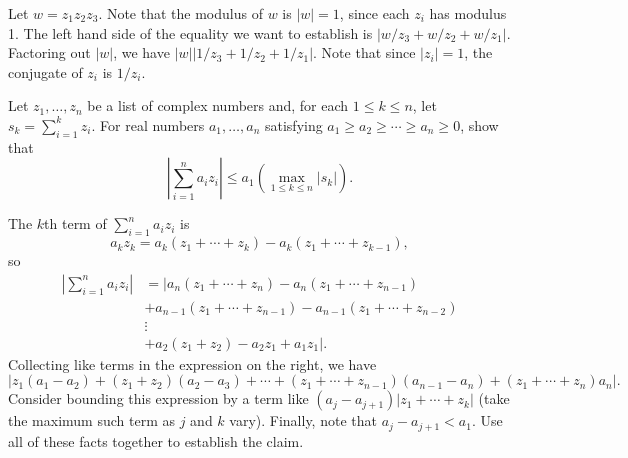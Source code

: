\smallskip
\begin{hint}
Let $w =  z_1 z_2 z_3$. Note that the modulus of $w$ is $|w| = 1$, since each $z_i$ has modulus 1.
The left hand side of the equality we want to establish is
$| w/z_3 + w/z_2 + w/z_1 |$.
Factoring out $|w|$, we have $|w| |1/z_3 + 1/z_2 + 1/z_1|$.
Note that since $|z_i|=1$, the conjugate of $z_i$ is $1/z_i$.
\end{hint}
\probskip

\begin{prob} 
Let $z_1, \dots, z_n$ be a list of complex
numbers and, for each $1 \leq k \leq n$, 
let $s_k = \sum_{i=1}^k z_i$. For real numbers
$a_1, \dots, a_n$ satisfying 
$a_1 \geq a_2 \geq \cdots \geq a_n \geq 0$, 
show that
\begin{equation}
\label{eq:Abels}  
\left| \sum_{i=1}^n a_i z_i \right| 
\leq a_1 \left( \max_{1 \leq k \leq n} |s_k|\right).
\end{equation}
\end{prob}
\smallskip
\begin{hint}
The $k$th term of $\sum_{i=1}^n a_i z_i$ is 
\[
a_k z_k = a_k (z_1+\cdots + z_k) - a_k (z_1+\cdots + z_{k-1}),
\]
so
\begin{align*}
\left| \sum_{i=1}^n a_i z_i \right|  
&= \left|a_n (z_1+\cdots + z_n) - a_n (z_1+\cdots + z_{n-1}) \right.\\
&+ a_{n-1} (z_1+\cdots + z_{n-1}) - a_{n-1} (z_1+\cdots + z_{n-2}) \\
& \vdots\\
&+ a_2 (z_1+z_2) - a_2 z_1 + \left.a_1 z_1\right|.
\end{align*}
Collecting like terms in the expression on the right, we have
\[
\left| z_1(a_1-a_2)+ (z_1+ z_2)(a_2-a_3) + \cdots + (z_1+\cdots +
  z_{n-1})(a_{n-1}-a_n) + (z_1+\cdots + z_{n})a_n \right|. \]
Consider bounding this expression by a term like
$(a_j - a_{j+1})|z_1+\cdots+ z_k|$ (take the maximum such term as $j$ and $k$
vary).  Finally, note that $a_j - a_{j+1} < a_1$.  Use all of these facts
together to establish the claim.  
\end{hint}
\probskip



